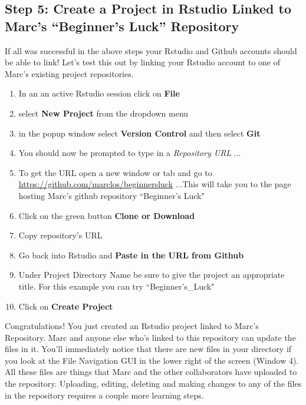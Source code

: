 \documentclass{article}\usepackage[]{graphicx}\usepackage[]{color}
\begin{document}
  \subsection*{Step 5: Create a Project in Rstudio Linked to Marc's ``Beginner's Luck'' Repository}
If all was successful in the above steps your Rstudio and Github accounts should be able to link! Let's test this out by linking your Rstudio account to one of Marc's existing project repositories. 
  \begin{enumerate}
  \item In an an active Rstudio session click on \textbf{File}
  \item select \textbf{New Project} from the dropdown menu
  \item in the popup window select \textbf{Version Control} and then select \textbf{Git}
  \item You should now be prompted to type in a \emph{Repository URL} ...
  \item To get the URL open a new window or tab and go to \url{https://github.com/marclos/beginnersluck} ...This will take you to the page hosting Marc's github repository ``Beginner's Luck"
  \item Click on the green button \textbf{Clone or Download}
  \item Copy repository's URL
  \item Go back into Rstudio and \textbf{Paste in the URL from Github}
  \item Under Project Directory Name be sure to give the project an appropriate title. For this example you can try ``Beginner's\_Luck"
  \item Click on \textbf{Create Project} 
  \end{enumerate} 
Congratulations! You just created an Rstudio project linked to Marc's Repository. Marc and anyone else who's linked to this repository can update the files in it. You'll immediately notice that there are new files in your directory if you look at the File Navigation GUI in the lower right of the screen (Window 4). All these files are things that Marc and the other collaborators have uploaded to the repository. Uploading, editing, deleting and making changes to any of the files in the repository requires a couple more learning steps. 
\end{document}
